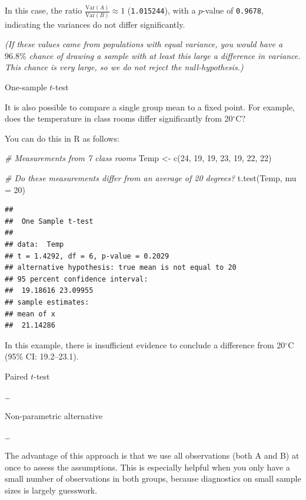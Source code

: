 \documentclass[
]{book}
\newenvironment{Shaded}{\begin{snugshade}}{\end{snugshade}}
\newcommand{\AttributeTok}[1]{\textcolor[rgb]{0.77,0.63,0.00}{#1}}
\newcommand{\CommentTok}[1]{\textcolor[rgb]{0.56,0.35,0.01}{\textit{#1}}}
\newcommand{\DecValTok}[1]{\textcolor[rgb]{0.00,0.00,0.81}{#1}}
\newcommand{\FunctionTok}[1]{\textcolor[rgb]{0.00,0.00,0.00}{#1}}
\newcommand{\NormalTok}[1]{#1}
\newcommand{\OtherTok}[1]{\textcolor[rgb]{0.56,0.35,0.01}{#1}}
\begin{document}
In this case, the ratio \(\frac{\text{Var}(A)}{\text{Var}(B)} \approx 1\) (\texttt{1.015244}), with a \(p\)-value of \texttt{0.9678}, indicating the variances do not differ significantly.

\emph{(If these values came from populations with equal variance, you would have a \(96.8\%\) chance of drawing a sample with at least this large a difference in variance. This chance is very large, so we do not reject the null-hypothesis.)}

One-sample \(t\)-test

It is also possible to compare a single group mean to a fixed point. For example, does the temperature in class rooms differ significantly from 20\(^\circ\)C?

You can do this in R as follows:

\begin{Shaded}
\begin{Highlighting}[]
\CommentTok{\# Measurements from 7 class rooms}
\NormalTok{Temp }\OtherTok{\textless{}{-}} \FunctionTok{c}\NormalTok{(}\DecValTok{24}\NormalTok{, }\DecValTok{19}\NormalTok{, }\DecValTok{19}\NormalTok{, }\DecValTok{23}\NormalTok{, }\DecValTok{19}\NormalTok{, }\DecValTok{22}\NormalTok{, }\DecValTok{22}\NormalTok{)}

\CommentTok{\# Do these measurements differ from an average of 20 degrees?}
\FunctionTok{t.test}\NormalTok{(Temp, }\AttributeTok{mu =} \DecValTok{20}\NormalTok{)}
\end{Highlighting}
\end{Shaded}

\begin{verbatim}
## 
##  One Sample t-test
## 
## data:  Temp
## t = 1.4292, df = 6, p-value = 0.2029
## alternative hypothesis: true mean is not equal to 20
## 95 percent confidence interval:
##  19.18616 23.09955
## sample estimates:
## mean of x 
##  21.14286
\end{verbatim}

In this example, there is insufficient evidence to conclude a difference from 20\(^\circ\)C (95\% CI: 19.2--23.1).

Paired \(t\)-test

\ldots{}

Non-parametric alternative

\ldots{}

The advantage of this approach is that we use all observations (both A and B) at once to assess the assumptions. This is especially helpful when you only have a small number of observations in both groups, because diagnostics on small sample sizes is largely guesswork.
\end{document}

